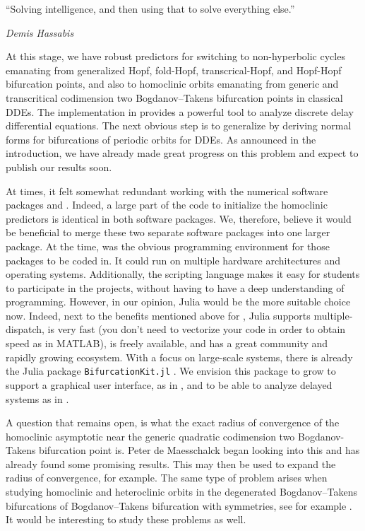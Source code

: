 \epigraph{ ``Solving intelligence, and then using that to solve everything
else.''}{{\it Demis Hassabis}}
At this stage, we have robust predictors for switching to  non-hyperbolic cycles
emanating from generalized Hopf, fold-Hopf, transcrical-Hopf, and Hopf-Hopf
bifurcation points, and also to homoclinic orbits emanating from generic and
transcritical codimension two Bogdanov--Takens bifurcation points in classical
DDEs. The implementation in \DDEBIFTOOL provides a powerful tool to analyze
discrete delay differential equations. The next obvious step is to generalize
\cite{Kuznetsov2005,DeWitte2013,DeWitte2014} by deriving normal forms for
bifurcations of periodic orbits for DDEs. As announced in the introduction, we
have already made great progress on this problem and expect to publish our results
soon.

At times, it felt somewhat redundant working with the numerical software packages
\DDEBIFTOOL and \MATCONT. Indeed, a large part of the code to initialize the
homoclinic predictors is identical in both software packages. We, therefore,
believe it would be beneficial to merge these two separate software packages into
one larger package. At the time, \MATLAB was the obvious programming environment
for those packages to be coded in. It could run on multiple hardware
architectures and operating systems. Additionally, the scripting language makes
it easy for students to participate in the projects, without having to have a
deep understanding of programming. However, in our opinion, Julia would be the
more suitable choice now. Indeed, next to the benefits mentioned above for
\MATLAB, Julia supports multiple-dispatch, is very fast (you don't need to
vectorize your code in order to obtain speed as in MATLAB), is freely
available, and has a great community and rapidly growing ecosystem. With a focus
on large-scale systems, there is already the Julia package
\texttt{BifurcationKit.jl} \cite{veltz:hal-02902346}. We
envision this package to grow to support a graphical user interface, as in
\MATCONT, and to be able to analyze delayed systems as in \DDEBIFTOOL.

A question that remains open, is what the exact radius of convergence of the
homoclinic asymptotic near the generic quadratic codimension two Bogdanov-Takens
bifurcation  point is. Peter de Maesschalck began looking into this and has
already found some promising results. This may then be used to expand the radius
of convergence, for example. The same type of problem arises when studying
homoclinic and heteroclinic orbits in the degenerated Bogdanov--Takens
bifurcations of Bogdanov--Takens bifurcation with symmetries, see for example
\cite{chow_li_wang_1994}. It would be interesting to study these problems as
well. 

